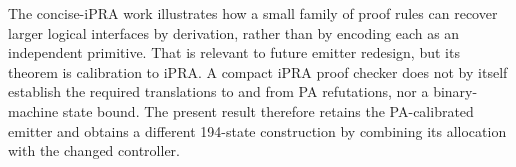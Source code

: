 The concise-iPRA work illustrates how a small family of proof rules can
recover larger logical interfaces by derivation, rather than by encoding
each as an independent primitive.  That is relevant to future emitter
redesign, but its theorem is calibration to iPRA.  A compact iPRA proof
checker does not by itself establish the required translations to and
from PA refutations, nor a binary-machine state bound.  The present result
therefore retains the PA-calibrated emitter and obtains a different
194-state construction by combining its allocation with the changed controller.
